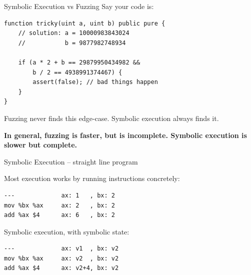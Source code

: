 \documentclass[aspectratio=169]{beamer}
\begin{document}

\begin{frame}[fragile=singleslide]{Symbolic Execution vs Fuzzing}
Say your code is:

\begin{Verbatim}[frame=single, framerule=0.2mm, framesep=2mm,fontsize=\small]
function tricky(uint a, uint b) public pure {
	// solution: a = 10000983843024
	//           b = 9877982748934
	
	if (a * 2 + b == 29879950434982 &&
	    b / 2 == 4938991374467) {
		assert(false); // bad things happen
	}
}
\end{Verbatim}

Fuzzing never finds this edge-case. Symbolic execution always finds it.
\bigskip 

\textbf{In general, fuzzing is faster, but is incomplete. Symbolic execution is slower but complete.}

\end{frame}



\begin{frame}[fragile=singleslide]{Symbolic Execution -- straight line program}

Most execution works by running instructions concretely:
\begin{verbatim}
---             ax: 1   , bx: 2
mov %bx %ax     ax: 2   , bx: 2
add %ax $4      ax: 6   , bx: 2
\end{verbatim}
\bigskip

Symbolic execution, with symbolic state:
\begin{verbatim}
---             ax: v1  , bx: v2
mov %bx %ax     ax: v2  , bx: v2
add %ax $4      ax: v2+4, bx: v2
\end{verbatim}
\end{frame}
\end{document}
